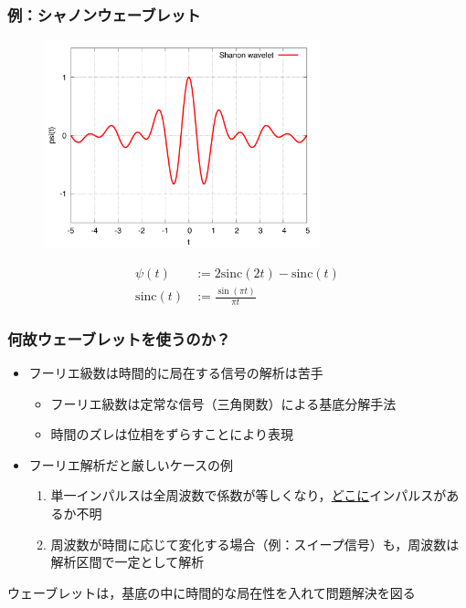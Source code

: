 \documentclass[dvipdfmx,graphicx,14pt]{beamer}
\begin{document}
\begin{frame}[c]
    \frametitle{例：シャノンウェーブレット}
    \vspace*{-10pt}
    \begin{figure}
        \includegraphics[width=80mm]{./figs/shanon_wavelet.pdf}
    \end{figure}
    \vspace*{-5pt}
    \begin{align*}
        \psi(t) &:= 2\mathrm{sinc}(2t) - \mathrm{sinc}(t) \\
        \mathrm{sinc}(t) &:= \frac{\sin(\pi t)}{\pi t}
    \end{align*}
\end{frame}

\begin{frame}[c]
    \frametitle{何故ウェーブレットを使うのか？}
    \begin{itemize}
        \item フーリエ級数は時間的に局在する信号の解析は苦手
            \begin{itemize}
                \item フーリエ級数は定常な信号（三角関数）による基底分解手法
                \item 時間のズレは位相をずらすことにより表現
            \end{itemize}
        \item フーリエ解析だと厳しいケースの例
            \begin{enumerate}
                \item 単一インパルスは全周波数で係数が等しくなり，\underline{どこに}インパルスがあるか不明
                \item 周波数が時間に応じて変化する場合（例：スイープ信号）も，周波数は解析区間で一定として解析
            \end{enumerate}
    \end{itemize}
    \begin{block}{}
        ウェーブレットは，基底の中に時間的な局在性を入れて問題解決を図る
    \end{block}
\end{frame}
\end{document}
